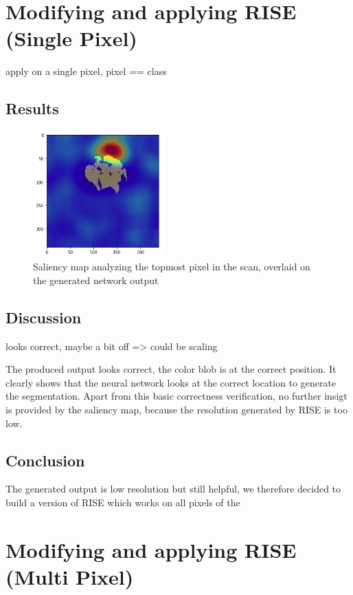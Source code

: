 \section{Modifying and applying RISE (Single Pixel)}

apply on a single pixel, pixel == class

\subsection{Results}

\begin{figure}[H]
\centering
\includegraphics[width=5cm]{chapters/04_segmentation/images/rise_single_pixel.png}
\caption{Saliency map analyzing the topmost pixel in the scan, overlaid on the generated network output}
\end{figure}



\subsection{Discussion}
looks correct, maybe a bit off => could be scaling

The produced output looks correct, the color blob is at the correct position. It clearly shows that the neural network looks at the correct location to generate the segmentation.
Apart from this basic correctness verification, no further insigt is provided by the saliency map, because the resolution generated by RISE is too low.

\subsection{Conclusion}
The generated output is low resolution but still helpful, we therefore decided to build a version of RISE which works on all pixels of the 

\section{Modifying and applying RISE (Multi Pixel)}


